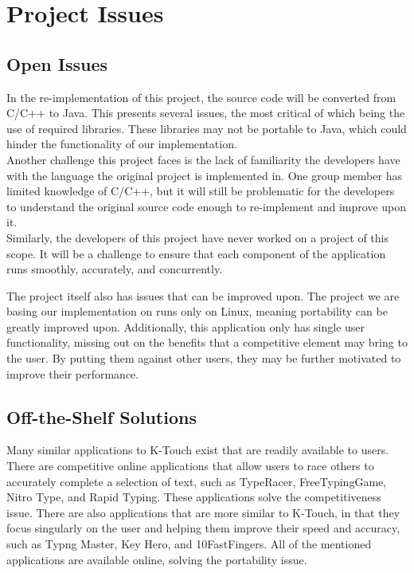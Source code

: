 \documentclass[12pt, titlepage]{article}
\begin{document}
\section{Project Issues}
\subsection{Open Issues}
\indent \indent In the re-implementation of this project, the source code will be converted from C/C++ to Java. This presents several issues, the most critical of which being the use of required libraries. These libraries may not be portable to Java, which could hinder the functionality of our implementation. 
\\
\indent Another challenge this project faces is the lack of familiarity the developers have with the language the original project is implemented in. One group member has limited knowledge of C/C++, but it will still be problematic for the developers to understand the original source code enough to re-implement and improve upon it.
\\
\indent Similarly, the developers of this project have never worked on a project of this scope. It will be a challenge to ensure that each component of the application runs smoothly, accurately, and concurrently.

\indent The project itself also has issues that can be improved upon. The project we are basing our implementation on runs only on Linux, meaning portability can be greatly improved upon. Additionally, this application only has single user functionality, missing out on the benefits that a competitive element may bring to the user. By putting them against other users, they may be further motivated to improve their performance.

\subsection{Off-the-Shelf Solutions}
\indent \indent Many similar applications to K-Touch exist that are readily available to users. There are competitive online applications that allow users to race others to accurately complete a selection of text, such as TypeRacer, FreeTypingGame, Nitro Type, and Rapid Typing. These applications solve the competitiveness issue. There are also applications that are more similar to K-Touch, in that they focus singularly on the user and helping them improve their speed and accuracy, such as Typng Master, Key Hero, and 10FastFingers. All of the mentioned applications are available online, solving the portability issue.
\end{document}
